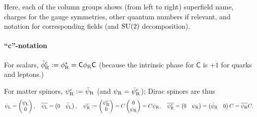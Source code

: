 \documentclass[CheatSheet]{subfiles}
\begin{document}
 \noindent
Here, each of the column groups shows (from left to right) superfield name, charges for the gauge symmetries, other quantum numbers if relevant, and notation for corresponding fields (and $\operatorname{\mathrm SU}(2)$ decomposition).


\paragraph{``c''-notation}
For scalars, $\tilde\phi_{\mathrm{R}}^{\mathrm{c}}:=\phi_{\mathrm{R}}^*=\mathsf{C} \phi_{\mathrm{R}}\mathsf{C}$ (because the intrinsic phase for $\mathsf C$ is $+1$ for quarks and leptons.)

For matter spinors, $\psi_{\mathrm{R}}^{\mathrm{c}}:=\bar\psi_{\mathrm{R}}$ (and $\psi_{\mathrm{R}}=\bar\psi_{\mathrm{R}}^{\mathrm{c}}$); Dirac spinors are thus
\begin{equation}
\displaystyle \psi_{\mathrm{L}} =\begin{pmatrix}\psi_{\mathrm{L}}\\0\end{pmatrix},\quad
\displaystyle \overline{\psi_{\mathrm{L}}} = \begin{pmatrix}0&\bar\psi_{\mathrm{L}}\end{pmatrix},\quad
 \psi_{\mathrm{R}}^{\mathrm{c}} :=\begin{pmatrix}\psi_{\mathrm{R}}^{\mathrm{c}} \\ 0\end{pmatrix}=C\begin{pmatrix}0\\\psi_{\mathrm{R}}\end{pmatrix} = C\psi_{\mathrm{R}},
\quad
 \overline{\psi_{\mathrm{R}}^{\mathrm{c}}} = \begin{pmatrix}0 & \psi_{\mathrm{R}}\end{pmatrix} = \begin{pmatrix}\bar\psi_{\mathrm{R}} & 0\end{pmatrix}C  = \overline{\psi_{\mathrm{R}}} C.\notag
\end{equation}
\end{document}
